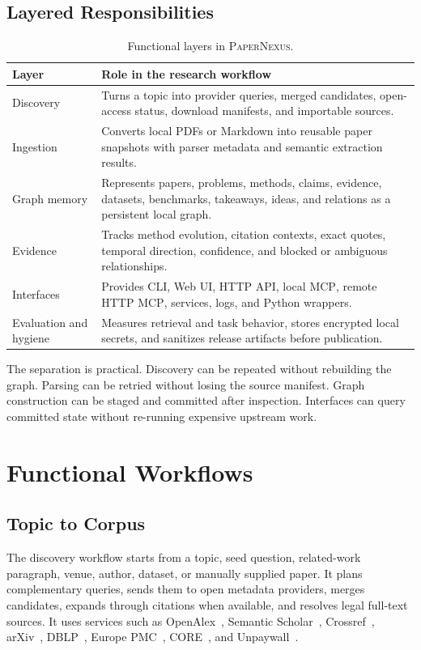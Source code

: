 \documentclass[11pt]{article}
\newcommand{\papernexus}{\textsc{PaperNexus}}
\newcommand{\mcp}{\textsc{MCP}}
\begin{document}
\subsection{Layered Responsibilities}

\begin{table}[t]
\centering
\caption{Functional layers in \papernexus{}.}
\label{tab:layers}
\begin{tabularx}{\linewidth}{@{}lY@{}}
\toprule
Layer & Role in the research workflow \\
\midrule
Discovery & Turns a topic into provider queries, merged candidates, open-access status, download manifests, and importable sources. \\
Ingestion & Converts local PDFs or Markdown into reusable paper snapshots with parser metadata and semantic extraction results. \\
Graph memory & Represents papers, problems, methods, claims, evidence, datasets, benchmarks, takeaways, ideas, and relations as a persistent local graph. \\
Evidence & Tracks method evolution, citation contexts, exact quotes, temporal direction, confidence, and blocked or ambiguous relationships. \\
Interfaces & Provides CLI, Web UI, HTTP API, local \mcp{}, remote HTTP \mcp{}, services, logs, and Python wrappers. \\
Evaluation and hygiene & Measures retrieval and task behavior, stores encrypted local secrets, and sanitizes release artifacts before publication. \\
\bottomrule
\end{tabularx}
\end{table}

The separation is practical. Discovery can be repeated without rebuilding the graph. Parsing can be retried without losing the source manifest. Graph construction can be staged and committed after inspection. Interfaces can query committed state without re-running expensive upstream work.

\section{Functional Workflows}

\subsection{Topic to Corpus}

The discovery workflow starts from a topic, seed question, related-work paragraph, venue, author, dataset, or manually supplied paper. It plans complementary queries, sends them to open metadata providers, merges candidates, expands through citations when available, and resolves legal full-text sources. It uses services such as OpenAlex~\citep{openalex}, Semantic Scholar~\citep{semanticscholar}, Crossref~\citep{crossref}, arXiv~\citep{arxivapi}, DBLP~\citep{dblp}, Europe PMC~\citep{europepmc}, CORE~\citep{coreapi}, and Unpaywall~\citep{unpaywall}.
\end{document}
